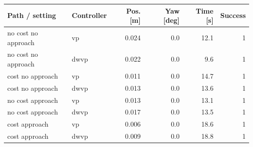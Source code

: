 \begin{tabular}{llrrrr}
\hline
Path / setting & Controller & Pos. [m] & Yaw [deg] & Time [s] & Success \\
\hline
no cost no approach & vp & 0.024 & 0.0 & 12.1 & 1 \\
no cost no approach & dwvp & 0.022 & 0.0 & 9.6 & 1 \\
cost no approach & vp & 0.011 & 0.0 & 14.7 & 1 \\
cost no approach & dwvp & 0.013 & 0.0 & 13.6 & 1 \\
no cost approach & vp & 0.013 & 0.0 & 13.1 & 1 \\
no cost approach & dwvp & 0.017 & 0.0 & 13.5 & 1 \\
cost approach & vp & 0.006 & 0.0 & 18.6 & 1 \\
cost approach & dwvp & 0.009 & 0.0 & 18.8 & 1 \\
\hline
\end{tabular}

